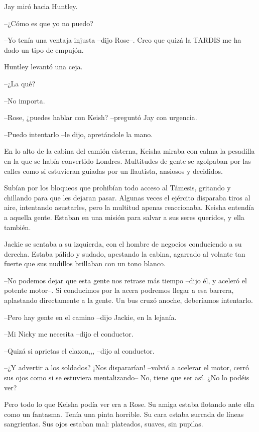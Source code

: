 {Jay miró hacia Huntley.}

{--¿Cómo es que yo no puedo?}

{--Yo tenía una ventaja injusta --dijo Rose--. Creo que quizá la TARDIS
me ha dado un tipo de empujón.}

{Huntley levantó una ceja.}

{--¿La qué?}

{--No importa.}

{--Rose, ¿puedes hablar con Keish? --preguntó Jay con urgencia.}

{--Puedo intentarlo --le dijo, apretándole la mano.}

\mbox{}

{En lo alto de la cabina del camión cisterna, Keisha miraba con calma la
 pesadilla en la que se había convertido Londres. Multitudes de gente se
 agolpaban por las calles como si estuvieran guiadas por un flautista,
ansiosos y decididos.}

{Subían por los bloqueos que prohibían todo acceso al Támesis, gritando
 y chillando para que les dejaran pasar. Algunas veces el ejército
 disparaba tiros al aire, intentando asustarles, pero la multitud apenas
 reaccionaba. Keisha entendía a aquella gente. Estaban en una misión para
salvar a sus seres queridos, y ella también.}

{Jackie se sentaba a su izquierda, con el hombre de negocios conduciendo
 a su derecha. Estaba pálido y sudado, apestando la cabina, agarrado al
volante tan fuerte que sus nudillos brillaban con un tono blanco.}

{--No podemos dejar que esta gente nos retrase más tiempo --dijo él, y
 aceleró el potente motor--. Si conducimos por la acera podremos llegar a
 esa barrera, aplastando directamente a la gente. Un bus cruzó anoche,
deberíamos intentarlo.}

{--Pero hay gente en el camino --dijo Jackie, en la lejanía.}

{--Mi Nicky me necesita --dijo el conductor.}

{--Quizá si aprietas el claxon,,, --dijo al conductor.}

{--¿Y advertir a los soldados? ¡Nos dispararían! --volvió a acelerar el
 motor, cerró sus ojos como si se estuviera mentalizando-- No, tiene que
ser así. ¿No lo podéis ver?}

{Pero todo lo que Keisha podía ver era a Rose. Su amiga estaba flotando
 ante ella como un fantasma. Tenía una pinta horrible. Su cara estaba
 surcada de líneas sangrientas. Sus ojos estaban mal: plateados, suaves,
sin pupilas.}

